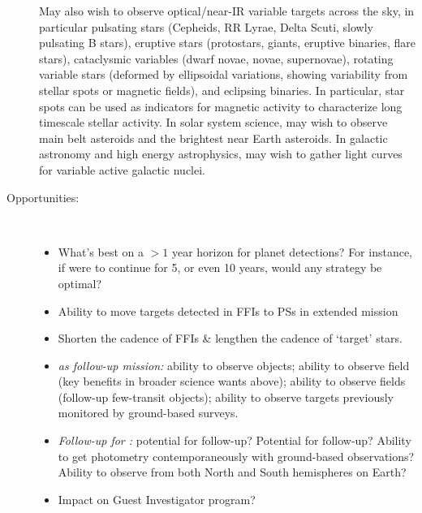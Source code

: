 \begin{description}
	May also wish to observe optical/near-IR variable targets across the sky, in particular 
	pulsating stars (Cepheids, RR Lyrae, Delta Scuti, slowly pulsating B stars),
	eruptive stars (protostars, giants, eruptive binaries, flare stars), 
	cataclysmic variables (dwarf novae, novae, supernovae), 
	rotating variable stars (deformed by ellipsoidal variations, showing variability from stellar spots or magnetic fields),
	and eclipsing binaries.
	In particular, star spots can be used as indicators for magnetic activity to characterize long timescale stellar activity.
	In solar system science, may wish to observe main belt asteroids and the brightest near Earth asteroids.
	In galactic astronomy and high energy astrophysics, may wish to gather light curves for variable active galactic nuclei.

	\item[Opportunities:]\ 
	\begin{itemize}
		\item What's best on a $>1$ year horizon for planet detections? For instance, if \tess were to continue for 5, or even 10 years, would any strategy be optimal?
		\item Ability to move targets detected in FFIs to PSs in extended mission
		\item Shorten the cadence of FFIs \& lengthen the cadence of `target' stars.
		\item \textit{\tess as follow-up mission:} 
		ability to observe \corot objects; 
		ability to observe \kepler field (key benefits in broader science wants above); 
		ability to observe \ktwo fields (follow-up \ktwo few-transit objects);
		ability to observe targets previously monitored by ground-based surveys.
		\item \textit{Follow-up for \tess:} 
		potential for \jwst follow-up? 
		Potential for \cheops follow-up? 
		Ability to get \tess photometry contemporaneously with ground-based observations?
		Ability to observe from both North and South hemispheres on Earth?
		\item Impact on Guest Investigator program?
	\end{itemize}
	

\end{description}
